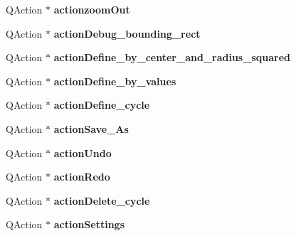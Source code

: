 \begin{DoxyCompactItemize}
\item 
\mbox{\label{class_ui___main_window_a749319d9c2f86308f4559091acff6910}} 
Q\+Action $\ast$ {\bfseries actionzoom\+Out}
\item 
\mbox{\label{class_ui___main_window_ab922a617328dd984d45d82e8aa460d13}} 
Q\+Action $\ast$ {\bfseries action\+Debug\+\_\+bounding\+\_\+rect}
\item 
\mbox{\label{class_ui___main_window_a80f63d6b857721d1d102cd7ba5063878}} 
Q\+Action $\ast$ {\bfseries action\+Define\+\_\+by\+\_\+center\+\_\+and\+\_\+radius\+\_\+squared}
\item 
\mbox{\label{class_ui___main_window_a0b0a125bc543f541304b27a09559e72d}} 
Q\+Action $\ast$ {\bfseries action\+Define\+\_\+by\+\_\+values}
\item 
\mbox{\label{class_ui___main_window_a1087883ccba9316d3703d696746101d3}} 
Q\+Action $\ast$ {\bfseries action\+Define\+\_\+cycle}
\item 
\mbox{\label{class_ui___main_window_a1e11ac34a44aeff9d0f198e5f2537dab}} 
Q\+Action $\ast$ {\bfseries action\+Save\+\_\+\+As}
\item 
\mbox{\label{class_ui___main_window_a175147fd65feca1da9052479372408bd}} 
Q\+Action $\ast$ {\bfseries action\+Undo}
\item 
\mbox{\label{class_ui___main_window_a92b45aedb3e89ab02aeed5c6a2e33520}} 
Q\+Action $\ast$ {\bfseries action\+Redo}
\item 
\mbox{\label{class_ui___main_window_acda444d81e28ab545b0834f0dc4ae647}} 
Q\+Action $\ast$ {\bfseries action\+Delete\+\_\+cycle}
\item 
\mbox{\label{class_ui___main_window_a5b65436e6cc259d5586eb6e309b612e4}} 
Q\+Action $\ast$ {\bfseries action\+Settings}
\item 
\mbox{\label{class_ui___main_window_a4b11cbb0ac3c833f389276df427fc172}} 

\end{DoxyCompactItemize}

